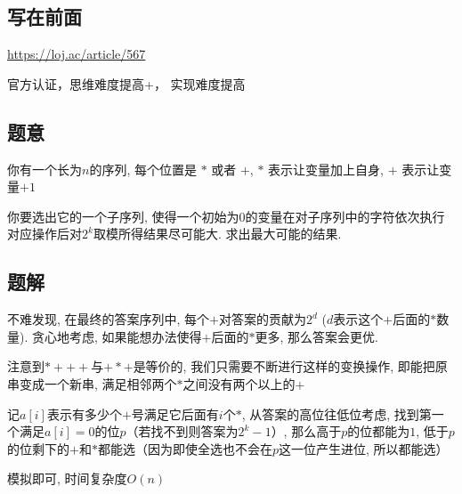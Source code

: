 \documentclass[12pt]{ctexart}
\begin{document}
\begin{spacing}{1.2}
	\subsection{写在前面}
	\href{https://loj.ac/article/567}{https://loj.ac/article/567}

	官方认证，思维难度提高+， 实现难度提高

	\subsection{题意}
	你有一个长为$n$的序列, 每个位置是 $*$ 或者 $+$, $*$ 表示让变量加上自身, $+$ 表示让变量$+1$

	你要选出它的一个子序列, 使得一个初始为$0$的变量在对子序列中的字符依次执行对应操作后对$2^k$取模所得结果尽可能大. 求出最大可能的结果. 

	\subsection{题解}

	不难发现, 在最终的答案序列中, 每个$+$对答案的贡献为$2^d$ ($d$表示这个$+$后面的$*$数量). 贪心地考虑, 如果能想办法使得$+$后面的$*$更多, 那么答案会更优. 

	注意到$*+++$与$+*+$是等价的, 我们只需要不断进行这样的变换操作, 即能把原串变成一个新串, 满足相邻两个$*$之间没有两个以上的$+$

	记$a[i]$表示有多少个$+$号满足它后面有$i$个$*$, 从答案的高位往低位考虑, 找到第一个满足$a[i]=0$的位$p$（若找不到则答案为$2^k-1$）, 那么高于$p$的位都能为$1$, 低于$p$的位剩下的$+$和$*$都能选（因为即使全选也不会在$p$这一位产生进位, 所以都能选）

	模拟即可, 时间复杂度$O(n)$

	\newpage

\end{spacing}
\end{document}

